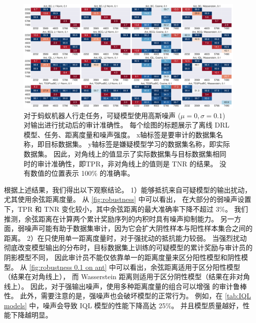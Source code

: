 \begin{figure}[!ht]
    \includegraphics[width=\hsize]{figure/orl_auditor/overall_sac_ant-v2_20230201161631240.pdf}
    \caption{
    对于蚂蚁机器人行走任务，可疑模型使用高斯噪声 ($\mu=0, \sigma=0.1$) 对输出进行扰动后的审计准确性。
    每个绘图的标题展示了离线 DRL 模型、任务、距离度量和噪声强度。
    x轴标签是要审计的数据集名称，即目标数据集。
    y轴标签是嫌疑模型学习的数据集名称，即实际数据集。
    因此，对角线上的值显示了实际数据集与目标数据集相同时的审计准确性，即TPR，非对角线上的值则是 TNR 的结果。
    没有数值的位置表示 100\% 的准确率。
    }
    \label{fig:robustness 0.1 on ant}
\end{figure}

根据上述结果，我们得出以下观察结论。
1）\sysnameo 能够抵抗来自可疑模型的输出扰动，尤其\sysnameo 使用余弦距离度量。
从 \autoref{fig:robustness} 中可以看出，
在大部分的弱噪声设置下，TPR 和 TNR 变化较小，其中余弦距离的最大准确率下降不超过 3\%。
我们推测，余弦距离在计算两个累计奖励序列的内积时具有噪声抑制能力。
另一方面，弱噪声可能有助于数据集审计，因为它会扩大阴性样本与阳性样本集合之间的距离。
2）\sysname 在只使用单一距离度量时，对于强扰动的抵抗能力较弱。
当强烈扰动彻底改变模型输出的分布时，目标数据集上训练的可疑模型的累计奖励与审计员的阴影模型不同，
因此审计员不能仅依靠单一的距离度量来区分阳性模型和阴性模型。
从 \autoref{fig:robustness 0.1 on ant} 中可以看出，余弦距离适用于区分阳性模型（结果在对角线上），
而 Wasserstein 距离则适用于区分阴性模型（结果在非对角线上）。
因此，对于强输出噪声，使用多种距离度量的组合可以增强 \sysname 的审计鲁棒性。
此外，需要注意的是，强噪声也会破坏模型的正常行为。
例如，在 \autoref{tab:IQL models} 中，噪声会导致 IQL 模型的性能下降高达 25\%。
并且模型质量越好，性能下降越明显。

